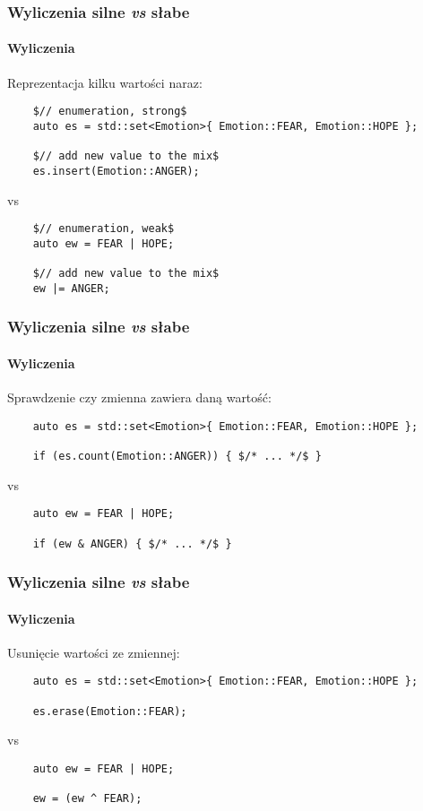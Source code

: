 \documentclass[aspectratio=169,10pt]{beamer}
\begin{document}
\begin{frame}[fragile]
    \frametitle{Wyliczenia silne \emph{vs} słabe}
    \framesubtitle{Wyliczenia}

    Reprezentacja kilku wartości naraz:

    {\scriptsize
    \begin{lstlisting}
    $// enumeration, strong$
    auto es = std::set<Emotion>{ Emotion::FEAR, Emotion::HOPE };

    $// add new value to the mix$
    es.insert(Emotion::ANGER);
    \end{lstlisting}}

    vs

    {\scriptsize
    \begin{lstlisting}
    $// enumeration, weak$
    auto ew = FEAR | HOPE;

    $// add new value to the mix$
    ew |= ANGER;
    \end{lstlisting}}
\end{frame}

\begin{frame}[fragile]
    \frametitle{Wyliczenia silne \emph{vs} słabe}
    \framesubtitle{Wyliczenia}

    Sprawdzenie czy zmienna zawiera daną wartość:

    {\scriptsize
    \begin{lstlisting}
    auto es = std::set<Emotion>{ Emotion::FEAR, Emotion::HOPE };

    if (es.count(Emotion::ANGER)) { $/* ... */$ }
    \end{lstlisting}}

    vs

    {\scriptsize
    \begin{lstlisting}
    auto ew = FEAR | HOPE;

    if (ew & ANGER) { $/* ... */$ }
    \end{lstlisting}}
\end{frame}

\begin{frame}[fragile]
    \frametitle{Wyliczenia silne \emph{vs} słabe}
    \framesubtitle{Wyliczenia}

    Usunięcie wartości ze zmiennej:

    {\scriptsize
    \begin{lstlisting}
    auto es = std::set<Emotion>{ Emotion::FEAR, Emotion::HOPE };

    es.erase(Emotion::FEAR);
    \end{lstlisting}}

    vs

    {\scriptsize
    \begin{lstlisting}
    auto ew = FEAR | HOPE;

    ew = (ew ^ FEAR);
    \end{lstlisting}}
\end{frame}
\end{document}
